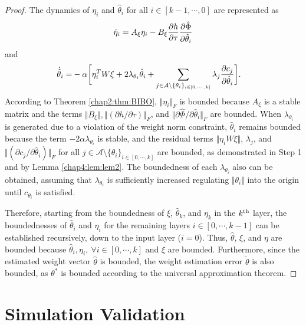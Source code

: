 \begin{proof}
The dynamics of $\eta_i$ and $\hat\theta_i$ for all $i\in [k-1,\cdots,0]$ are represented as
\begin{equation}
    \dot\eta_i = 
    A_\xi\eta_i -B_\xi {\partial h\over\partial\tau}
    {\partial \hat\Phi\over \partial \hat\theta_i}
\end{equation}
and
\begin{equation}
    \begin{aligned}
        \dot{\hat\theta}_i 
        =&
        -\alpha 
        \bigg[
            \eta_i^TW\xi+2\lambda_{\theta_i} \hat\theta_i
            +
            \sum_{j\in\mathcal{A}\setminus \{\theta_i\}_{i\in[0,\cdots,k]}}\lambda_j{\partial c_j\over\partial \hat\theta_i}
        \bigg].
    \end{aligned}
\end{equation}
According to Theorem \ref{chap2:thm:BIBO}, $\Vert\eta_i\Vert_F$ is bounded because $A_\xi$ is a stable matrix and the terms $\Vert B_\xi\Vert, \Vert(\partial h/\partial \tau)\Vert_F$, and $\Vert\partial \hat\Phi/\partial\hat\theta_i\Vert_F$ are bounded.
When $\lambda_{\theta_i}$ is generated due to a violation of the weight norm constraint, $\hat\theta_i$ remains bounded because the term $-2\alpha\lambda_{\theta_i}$ is stable, and the residual terms $\Vert\eta_iW\xi\Vert$, $\lambda_j$, and $\Vert(\partial c_j/\partial \hat\theta_i)\Vert_F$ for all $j\in\mathcal{A}\setminus \{\theta_i\}_{i\in[0,\cdots,k]}$ are bounded, as demonstrated in Step 1 and by Lemma \ref{chap4:lem:lem2}.
The boundedness of each $\lambda_{\theta_i}$ also can be obtained, assuming that $\lambda_{\theta_i}$ is sufficiently increased regulating $\Vert\theta_i\Vert$ into the origin until $c_{\theta_i}$ is satisfied.

Therefore, starting from the boundedness of $\xi$, $\hat\theta_k$, and $\eta_k$ in the $k\textsuperscript{th}$ layer, the boundednesses of $\hat\theta_i$ and $\eta_i$ for the remaining layers $i\in[0,\cdots,k-1]$ can be established recursively, down to the input layer ($i=0$). Thus, $\hat\theta$, $\xi$, and $\eta$ are bounded because $\hat\theta_i,\eta_i,\ \forall i\in[0,\cdots,k]$ and $\xi$ are bounded. Furthermore, since the estimated weight vector $\hat\theta$ is bounded, the weight estimation error $\tilde\theta$ is also bounded, as $\theta^*$ is bounded according to the universal approximation theorem.

\end{proof}

\section{Simulation Validation} 

